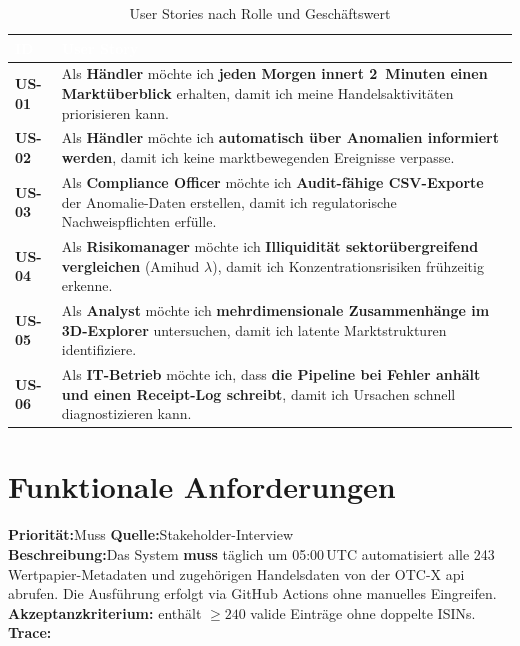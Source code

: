 \documentclass[11pt, a4paper, oneside, openany]{report}
\newcommand{\code}[1]{{\codefont\small\textcolor{DeepNavy}{#1}}}
\begin{document}
\begin{table}[H]
\centering
\caption{User Stories nach Rolle und Geschäftswert}
\label{tab:userstories}
\sffamily\small
\begin{tabularx}{\textwidth}{>{\bfseries\sffamily}l X}
  \toprule
  \rowcolor{DeepNavy} \textcolor{white}{\textbf{ID}} & \textcolor{white}{\textbf{User Story}} \\
  \midrule
  US-01 & Als \textbf{Händler} möchte ich \textbf{jeden Morgen innert 2~Minuten einen Marktüberblick} erhalten, damit ich meine Handelsaktivitäten priorisieren kann. \\
  US-02 & Als \textbf{Händler} möchte ich \textbf{automatisch über Anomalien informiert werden}, damit ich keine marktbewegenden Ereignisse verpasse. \\
  US-03 & Als \textbf{Compliance Officer} möchte ich \textbf{Audit-fähige CSV-Exporte} der Anomalie-Daten erstellen, damit ich regulatorische Nachweispflichten erfülle. \\
  US-04 & Als \textbf{Risikomanager} möchte ich \textbf{Illiquidität sektorübergreifend vergleichen} (Amihud $\lambda$), damit ich Konzentrationsrisiken frühzeitig erkenne. \\
  US-05 & Als \textbf{Analyst} möchte ich \textbf{mehrdimensionale Zusammenhänge im 3D-Explorer} untersuchen, damit ich latente Marktstrukturen identifiziere. \\
  US-06 & Als \textbf{IT-Betrieb} möchte ich, dass \textbf{die Pipeline bei Fehler anhält und einen Receipt-Log schreibt}, damit ich Ursachen schnell diagnostizieren kann. \\
  \bottomrule
\end{tabularx}
\end{table}

\section{Funktionale Anforderungen}
\label{sec:fa}

\begin{reqbox}
\textbf{Priorität:}\;Muss \quad \textbf{Quelle:}\;Stakeholder-Interview \\[4pt]
\textbf{Beschreibung:}\;Das System \textbf{muss} täglich um 05:00\,UTC automatisiert alle 243 Wertpapier-Metadaten und zugehörigen Handelsdaten von der OTC-X \gls{api} abrufen. Die Ausführung erfolgt via GitHub Actions ohne manuelles Eingreifen. \\[4pt]
\textbf{Akzeptanzkriterium:}\;\code{securities.csv} enthält $\geq 240$ valide Einträge ohne doppelte ISINs. \\[4pt]
\textbf{Trace:}\;\code{backend/operations/soft\_crawl.py}
\end{reqbox}
\end{document}
